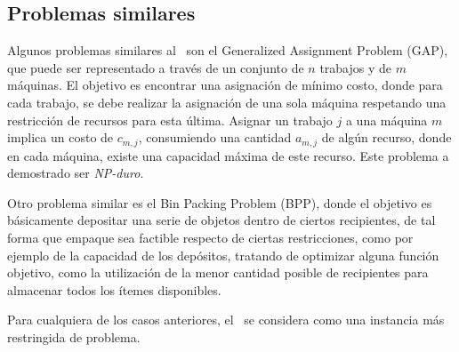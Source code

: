 \documentclass[../informe2.tex]{subfiles}
\begin{document}
\subsection{Problemas similares}
Algunos problemas similares al \mrp\ son el Generalized Assignment Problem (GAP), que puede ser representado a través de un conjunto de $n$ trabajos y de $m$ máquinas. El objetivo es encontrar una asignación de mínimo costo, donde para cada trabajo, se debe realizar la asignación de una sola máquina respetando una restricción de recursos para esta última. Asignar un trabajo $j$ a una máquina $m$ implica un costo de $c_{m,j}$, consumiendo una cantidad $a_{m,j}$ de algún recurso, donde en cada máquina, existe una capacidad máxima de este recurso. Este problema a demostrado ser \textit{NP-duro}. \par
\noindent Otro problema similar es el Bin Packing Problem (BPP), donde el objetivo es básicamente depositar una serie de objetos dentro de ciertos recipientes, de tal forma que empaque sea factible respecto de ciertas restricciones, como por ejemplo de la capacidad de los depósitos, tratando de optimizar alguna función objetivo, como la utilización de la menor cantidad posible de recipientes para almacenar todos los ítemes disponibles. \par
\noindent Para cualquiera de los casos anteriores, el \mrp\ se considera como una instancia más restringida de problema.
\end{document}

